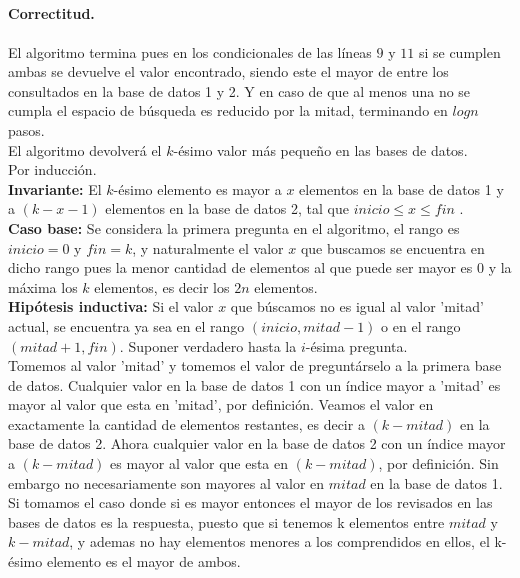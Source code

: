 \documentclass[12pt]{article}
\begin{document}
\subsection{}\paragraph{Correctitud.} 
El algoritmo termina pues en los condicionales de las líneas $9$ y $11$ si se cumplen ambas se devuelve el valor encontrado, siendo este el mayor de entre los consultados en la base de datos 1 y 2. Y en caso de que al menos una no se cumpla el espacio de búsqueda es reducido por la mitad, terminando en $logn$ pasos.\\
El algoritmo devolverá el $k$-ésimo valor más pequeño en las bases de datos.\\
Por inducción.\\
\textbf{Invariante: } El $k$-ésimo elemento es mayor a $x$ elementos en la base de datos 1 y a $(k-x-1)$ elementos en la base de datos 2, tal que $inicio \leq x \leq fin$ .\\
\textbf{Caso base:} Se considera la primera pregunta en el algoritmo, el rango es $inicio=0$ y $fin=k$, y naturalmente el valor $x$ que buscamos se encuentra en dicho rango pues la menor cantidad de elementos al que puede ser mayor es 0 y la máxima los $k$ elementos, es decir los $2n$ elementos.\\
\textbf{Hipótesis inductiva:} Si el valor $x$ que búscamos no es igual al valor 'mitad' actual, se encuentra ya sea en el rango $(inicio, mitad - 1)$ o en el rango $(mitad + 1, fin)$.
Suponer verdadero hasta la $i$-ésima pregunta.\\
Tomemos al valor 'mitad' y tomemos el valor de preguntárselo a la primera base de datos. Cualquier valor en la base de datos 1 con un índice mayor a 'mitad' es mayor al valor que esta en 'mitad', por definición. Veamos el valor en exactamente la cantidad de elementos restantes, es decir a $(k-mitad)$ en la base de datos 2. Ahora cualquier valor en la base de datos 2 con un índice mayor a $(k-mitad)$ es mayor al valor que esta en $(k-mitad)$, por definición. Sin embargo no necesariamente son mayores al valor en $mitad$ en la base de datos 1. \\
Si tomamos el caso donde si es mayor entonces el mayor de los revisados en las bases de datos es la respuesta, puesto que si tenemos k elementos entre $mitad$ y $k-mitad$, y ademas no hay elementos menores a los comprendidos en ellos, el k-ésimo elemento es el mayor de ambos.\\
\end{document}
